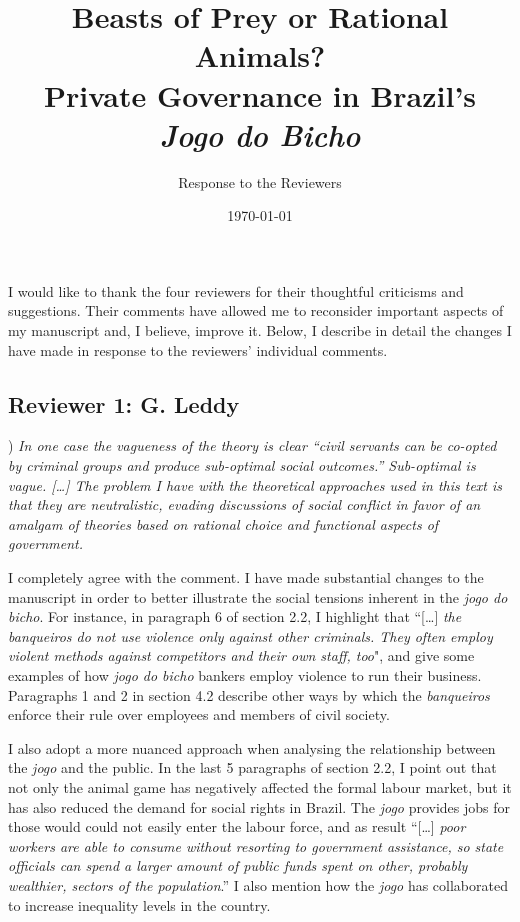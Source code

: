\documentclass[a4paper,12pt]{article}
\title{Beasts of Prey or Rational Animals? \\Private Governance in Brazil's \textit{Jogo do Bicho}}
\author{Response to the Reviewers}
\date{\today}
\begin{document}
\maketitle

I would like to thank the four reviewers for their thoughtful criticisms and suggestions. Their comments have allowed me to reconsider important aspects of my manuscript and, I believe, improve it. Below, I describe in detail the changes I have made in response to the reviewers' individual comments.

\subsection*{Reviewer 1: G. Leddy} %
\label{sub:reviewer_1_g_leddy}

) \textit{In one case the vagueness of the theory is clear ``civil servants can be co-opted by criminal groups and produce sub-optimal social outcomes.'' Sub-optimal is vague. [\dots] The problem I have with the theoretical approaches used in this text is that they are neutralistic, evading discussions of social conflict in favor of an amalgam of theories based on rational choice and functional aspects of government.}

\vspace{.25cm}

I completely agree with the comment. I have made substantial changes to the manuscript in order to better illustrate the social tensions inherent in the \textit{jogo do bicho}. For instance, in paragraph 6 of section 2.2, I highlight that ``[\dots] \textit{the banqueiros do not use violence only against other criminals. They often employ violent methods against competitors and their own staff, too}", and give some examples of how \textit{jogo do bicho} bankers employ violence to run their business. Paragraphs 1 and 2 in section 4.2 describe other ways by which the \textit{banqueiros} enforce their rule over employees and members of civil society.   

I also adopt a more nuanced approach when analysing the relationship between the \textit{jogo} and the public. In the last 5 paragraphs of section 2.2, I point out that not only the animal game has negatively affected the formal labour market, but it has also reduced the demand for social rights in Brazil. The \textit{jogo} provides jobs for those would could not easily enter the labour force, and as result ``[\dots] \textit{poor workers are able to consume without resorting to government assistance, so state officials can spend a larger amount of public funds spent on other, probably wealthier, sectors of the population}.'' I also mention how the \textit{jogo} has collaborated to increase inequality levels in the country.
\end{document}
